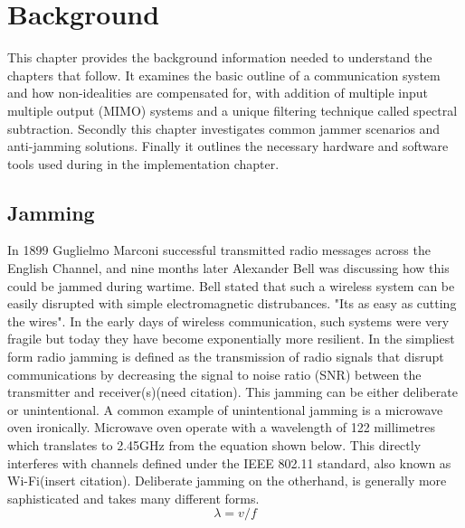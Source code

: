 \documentclass[11pt]{mvlthesis}
\begin{document}
\chapter{Background}
\label{ch:background}

This chapter provides the background information needed to understand the chapters that follow.  It examines the basic outline of a communication system and how non-idealities are compensated for, with addition of multiple input multiple output (MIMO) systems and a unique filtering technique called spectral subtraction.   Secondly this chapter investigates common jammer scenarios and anti-jamming solutions.  Finally it outlines the necessary hardware and software tools used during in the implementation chapter.

\section{Jamming}

In 1899 Guglielmo Marconi successful transmitted radio messages across the English Channel, and nine months later Alexander Bell was discussing how this could be jammed during wartime\cite{10}. Bell stated that such a wireless system can be easily disrupted with simple electromagnetic distrubances.  "Its as easy as cutting the wires".\cite{10}  In the early days of wireless communication, such systems were very fragile but today they have become exponentially more resilient. In the simpliest form radio jamming is defined as the transmission of radio signals that disrupt communications by decreasing the signal to noise ratio (SNR) between the transmitter and receiver(s)(need citation).  This jamming can be either deliberate or unintentional.  A common example of unintentional jamming is a microwave oven ironically.  Microwave oven operate with a wavelength of 122 millimetres which translates to 2.45GHz from the equation shown below.  This directly interferes with channels defined under the IEEE 802.11 standard, also known as Wi-Fi(insert citation).  Deliberate jamming on the otherhand, is generally more saphisticated and takes many different forms.\\

\begin{equation}
\lambda=v/f
\end{equation}
\end{document}
